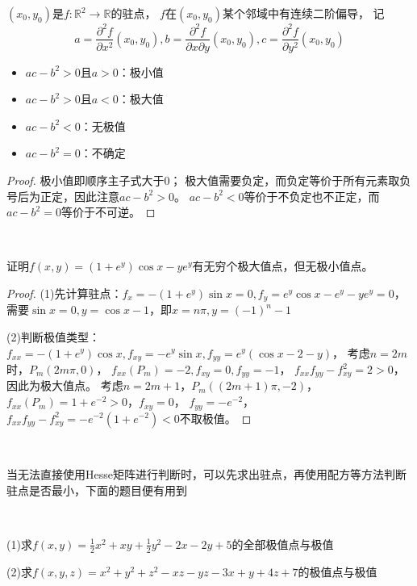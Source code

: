 \begin{corollary}[二元极值判别法]
  $(x_0,y_0)$是$f:\mathbb{R}^2 \rightarrow \mathbb{R}$的驻点，
  $f$在$(x_0,y_0)$某个邻域中有连续二阶偏导，
  记
  \begin{equation*}
    a = \frac{\partial ^2 f}{\partial x^2}(x_0,y_0), b = \frac{\partial^2 f}{\partial x \partial y}(x_0,y_0), c = \frac{\partial^2 f}{\partial y^2}(x_0,y_0)
  \end{equation*}
  \begin{itemize}
  \item $ac - b^2 > 0$且$a > 0$：极小值
  \item $ac - b^2 > 0$且$a < 0$：极大值
  \item $ac - b^2 < 0$：无极值
  \item $ac - b^2 = 0$：不确定
  \end{itemize}
\end{corollary}

\begin{proof}
  极小值即顺序主子式大于$0$；
  极大值需要负定，而负定等价于所有元素取负号后为正定，因此注意$ac - b^2 > 0$。
  $ac - b^2 < 0$等价于不负定也不正定，而$ac - b^2 = 0$等价于不可逆。
\end{proof}

~

\begin{exercise}
  证明$f(x,y) = (1 + e^y)\cos x - ye^y$有无穷个极大值点，但无极小值点。
\end{exercise}

\begin{proof}
  (1)先计算驻点：$f_x = -(1 + e^y) \sin x = 0, f_y = e^y \cos x - e^y - ye^y = 0$，
  需要$\sin x = 0, y = \cos x - 1$，即$x = n\pi, y = (-1)^n - 1$

  (2)判断极值类型：$f_{xx} = -(1 + e^y) \cos x, f_{xy} = -e^y \sin x, f_{yy} = e^y(\cos x - 2 - y)$，
  考虑$n = 2m$时，$P_m(2m\pi,0)$，
  $f_{xx}(P_m) = -2, f_{xy} = 0, f_{yy} = -1$，
  $f_{xx}f_{yy} - f_{xy}^2 = 2 > 0$，因此为极大值点。
  考虑$n = 2m+1$，$P_m((2m+1)\pi, -2)$，$f_{xx}(P_m) = 1 + e^{-2} > 0$，$f_{xy} = 0$，
  $f_{yy} = -e^{-2}$，
  $f_{xx}f_{yy} - f_{xy}^2 = -e^{-2}(1 + e^{-2}) < 0$不取极值。
\end{proof}

~

当无法直接使用Hesse矩阵进行判断时，可以先求出驻点，再使用配方等方法判断驻点是否最小，下面的题目便有用到

~

\begin{exercise}[计算极值点与极值]
  (1)求$f(x,y) = \frac{1}{2}x^2 + xy + \frac{1}{2}y^2 - 2x - 2y + 5$的全部极值点与极值

  (2)求$f(x,y,z) = x^2 + y^2 + z^2 -xz - yz - 3x + y + 4z + 7$的极值点与极值
\end{exercise}

